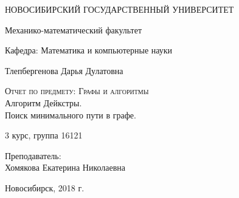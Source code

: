 \begin{titlepage}
  \begin{center}
     
    \vspace{0.5cm}
 
    НОВОСИБИРСКИЙ ГОСУДАРСТВЕННЫЙ УНИВЕРСИТЕТ
    \vspace{0.25cm}
     
    Механико-математический факультет
     
    Кафедра: Математика и компьютерные науки
    \vfill
     
     
    Тлепбергенова Дарья Дулатовна
    \vfill
 
    \textsc{Отчет по предмету: Графы и алгоритмы}\\[5mm]
     
    {\LARGE Алгоритм Дейкстры. \\
    Поиск минимального пути в графе.\\[2mm]}
  \bigskip
     
    3 курс, группа 16121
\end{center}
\vfill
 \newlength{\ML}
\hfill\begin{minipage}{0.4\textwidth}
  Преподаватель:\\
  Хомякова Екатерина Николаевна
\end{minipage}%
\bigskip

 \vfill
\begin{center}
  Новосибирск, 2018 г.
\end{center}
\end{titlepage}